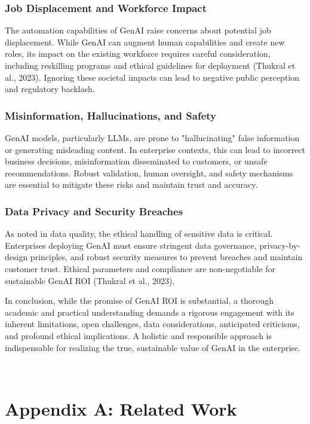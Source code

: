 \documentclass[10pt,journal,compsoc,twocolumn]{IEEEtran}
\begin{document}
\subsubsection{Job Displacement and Workforce Impact}

The automation capabilities of GenAI raise concerns about potential job displacement. While GenAI can augment human capabilities and create new roles, its impact on the existing workforce requires careful consideration, including reskilling programs and ethical guidelines for deployment (Thukral et al., 2023). Ignoring these societal impacts can lead to negative public perception and regulatory backlash.


\subsubsection{Misinformation, Hallucinations, and Safety}

GenAI models, particularly LLMs, are prone to "hallucinating" false information or generating misleading content. In enterprise contexts, this can lead to incorrect business decisions, misinformation disseminated to customers, or unsafe recommendations. Robust validation, human oversight, and safety mechanisms are essential to mitigate these risks and maintain trust and accuracy.


\subsubsection{Data Privacy and Security Breaches}

As noted in data quality, the ethical handling of sensitive data is critical. Enterprises deploying GenAI must ensure stringent data governance, privacy-by-design principles, and robust security measures to prevent breaches and maintain customer trust. Ethical parameters and compliance are non-negotiable for sustainable GenAI ROI (Thukral et al., 2023).

In conclusion, while the promise of GenAI ROI is substantial, a thorough academic and practical understanding demands a rigorous engagement with its inherent limitations, open challenges, data considerations, anticipated criticisms, and profound ethical implications. A holistic and responsible approach is indispensable for realizing the true, sustainable value of GenAI in the enterprise.

\





\section{Appendix A: Related Work}
\end{document}
